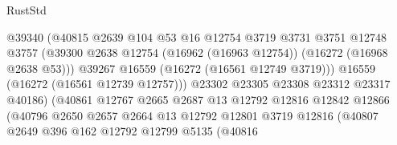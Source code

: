 \begin{lexlean}{RustStd}
\begin{coremodule}
                                        @39340
                                        (@40815
                                          @2639
                                          @104
                                          @53
                                          @16
                                          @12754
                                          @3719
                                          @3731
                                          @3751
                                          @12748
                                          @3757
                                          (@39300
                                            @2638
                                            @12754
                                            (@16962 (@16963 @12754))
                                            (@16272 (@16968 @2638 @53)))
                                          @39267
                                          @16559
                                          (@16272 (@16561 @12749 @3719)))
                                        @16559
                                        (@16272 (@16561 @12739 @12757)))
                                      @23302
                                      @23305
                                      @23308
                                      @23312
                                      @23317
                                      @40186)
                                    (@40861
                                      @12767
                                      @2665
                                      @2687
                                      @13
                                      @12792
                                      @12816
                                      @12842
                                      @12866
                                      (@40796
                                        @2650
                                        @2657
                                        @2664
                                        @13
                                        @12792
                                        @12801
                                        @3719
                                        @12816
                                        (@40807
                                          @2649
                                          @396
                                          @162
                                          @12792
                                          @12799
                                          @5135
                                          (@40816

\end{coremodule}
\end{lexlean}
